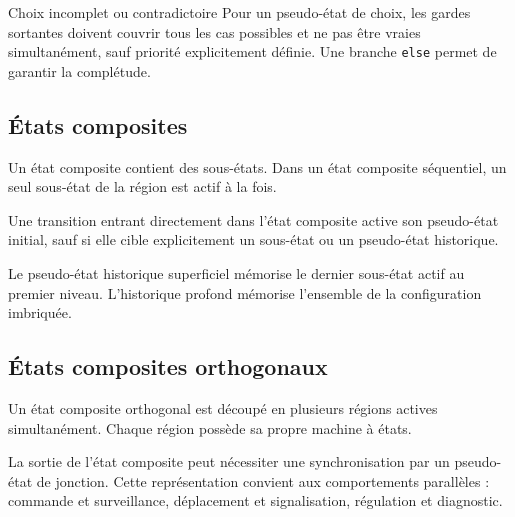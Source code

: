 \begin{center}\TLPseudoEtats\end{center}

\begin{TLLogicWarning}{Choix incomplet ou contradictoire}
Pour un pseudo-état de choix, les gardes sortantes doivent couvrir tous les cas possibles et ne pas être vraies simultanément, sauf priorité explicitement définie. Une branche \texttt{else} permet de garantir la complétude.
\end{TLLogicWarning}

\subsection{États composites}

Un état composite contient des sous-états. Dans un état composite séquentiel, un seul sous-état de la région est actif à la fois.

\begin{center}\TLEtatComposite\end{center}

Une transition entrant directement dans l'état composite active son pseudo-état initial, sauf si elle cible explicitement un sous-état ou un pseudo-état historique.

Le pseudo-état historique superficiel mémorise le dernier sous-état actif au premier niveau. L'historique profond mémorise l'ensemble de la configuration imbriquée.

\subsection{États composites orthogonaux}

Un état composite orthogonal est découpé en plusieurs régions actives simultanément. Chaque région possède sa propre machine à états.

\begin{center}\TLEtatOrthogonal\end{center}

La sortie de l'état composite peut nécessiter une synchronisation par un pseudo-état de jonction. Cette représentation convient aux comportements parallèles : commande et surveillance, déplacement et signalisation, régulation et diagnostic.

